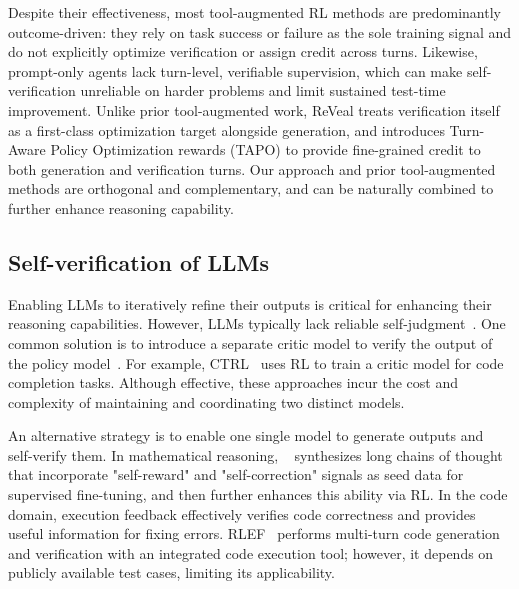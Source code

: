 \documentclass{article} %
\begin{document}
Despite their effectiveness, most tool-augmented RL methods are predominantly outcome-driven: they rely on task success or failure as the sole training signal and do not explicitly optimize verification or assign credit across turns. Likewise, prompt-only agents lack turn-level, verifiable supervision, which can make self-verification unreliable on harder problems and limit sustained test-time improvement. Unlike prior tool-augmented work, ReVeal treats verification itself as a first-class optimization target alongside generation, and introduces Turn-Aware Policy Optimization rewards (TAPO) to provide fine-grained credit to both generation and verification turns. Our approach and prior tool-augmented methods are orthogonal and complementary, and can be naturally combined to further enhance reasoning capability.

\subsection{Self-verification of LLMs}
Enabling LLMs to iteratively refine their outputs is critical for enhancing their reasoning capabilities. However, LLMs typically lack reliable self-judgment~\citep{huang2024largelanguagemodelsselfcorrect}. One common solution is to introduce a separate critic model to verify the output of the policy model~\citep{zhang2025generativeverifiersrewardmodeling,xie2025teachinglanguagemodelscritique}. For example, CTRL~\citep{xie2025teachinglanguagemodelscritique} uses RL to train a critic model for code completion tasks. Although effective, these approaches incur the cost and complexity of maintaining and coordinating two distinct models.

An alternative strategy is to enable one single model to generate outputs and self-verify them. In mathematical reasoning, ~\citep{xiong2025selfrewardingcorrectionmathematicalreasoning} synthesizes long chains of thought that incorporate "self-reward" and "self-correction" signals as seed data for supervised fine-tuning, and then further enhances this ability via RL. In the code domain, execution feedback effectively verifies code correctness and provides useful information for fixing errors. RLEF~\citep{gehring2025rlefgroundingcodellms} performs multi-turn code generation and verification with an integrated code execution tool; however, it depends on publicly available test cases, limiting its applicability.
\end{document}
